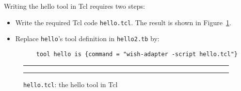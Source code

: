 Writing the hello tool in Tcl requires two steps:
\begin{itemize}
\item Write the required Tcl code {\tt hello.tcl}. The result is shown in Figure~\ref{fig:hello.tcl}.
\item Replace {\tt hello}'s tool definition in {\tt hello2.tb} by:
\begin{verbatim}
      tool hello is {command = "wish-adapter -script hello.tcl"}
\end{verbatim}
\end{itemize}


\begin{figure}
\rule{\textwidth}{0.5mm}

  \caption{{\tt hello.tcl}: the hello tool in Tcl}
  \label{fig:hello.tcl}
\rule{\textwidth}{0.5mm}
\end{figure}
